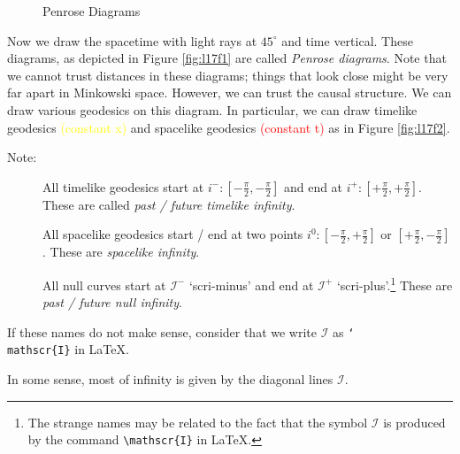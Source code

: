 \begin{figure}[tbhp]
  \centering
  \begin{minipage}[t]{0.5\columnwidth}
    \centering
    \def\svgwidth{0.9\textwidth}
    
    \caption{}
    \label{fig:l17f1}
  \end{minipage}%
  \begin{minipage}[t]{0.5\columnwidth}
    \centering
    \def\svgwidth{0.9\textwidth}
    
    \caption{}
    \label{fig:l17f2}
  \end{minipage}
  \caption{Penrose Diagrams}
  \label{fig:penrose-diagrams}
\end{figure}
Now we draw the spacetime with light rays at $45^\circ$ and time vertical. These diagrams, as depicted in Figure \ref{fig:l17f1} are called \emph{Penrose diagrams}.
Note that we cannot trust distances in these diagrams; things that look close might be very far apart in Minkowski space. However, we can trust the causal structure.
We can draw various geodesics on this diagram. 
In particular, we can draw timelike geodesics \textcolor{yellow}{(constant x)} %
and spacelike geodesics \textcolor{red}{(constant t)} %
as in Figure \ref{fig:l17f2}.
\begin{description}
  \item[Note:] All timelike geodesics start at $i^- \colon [- \frac{ \pi}{2}, - \frac{\pi}{2}]$ and end at $i^+ \colon [+ \frac{\pi}{2}, + \frac{\pi}{2}]$.
    These are called \emph{past / future timelike infinity}.
  \item[\bullet] All spacelike geodesics start / end at two points $i^0\colon [- \frac{\pi}{2}, + \frac{\pi}{2}]$ or $[+ \frac{\pi}{2}, - \frac{\pi}{2}]$. These are \emph{spacelike infinity}.
  \item[\bullet] All null curves start at $\mathscr{I}^-$ `scri-minus' and end at $\mathscr{I}^+$ `scri-plus'.\footnote{The strange names may be related to the fact that the symbol $\mathscr{I}$ is produced by the command \texttt{\textbackslash mathscr\{I\}} in \LaTeX.} These are \emph{past / future null infinity}.
\end{description}
\begin{leftbar}
  \begin{note}
    If these names do not make sense, consider that we write $\mathscr{I}$ as \texttt{\char`\\mathscr\{I\}} in \LaTeX.
  \end{note}
\end{leftbar}
\begin{leftbar}
  \begin{remark}
    In some sense, most of infinity is given by the diagonal lines $\mathscr{I}$.
  \end{remark}
\end{leftbar}

